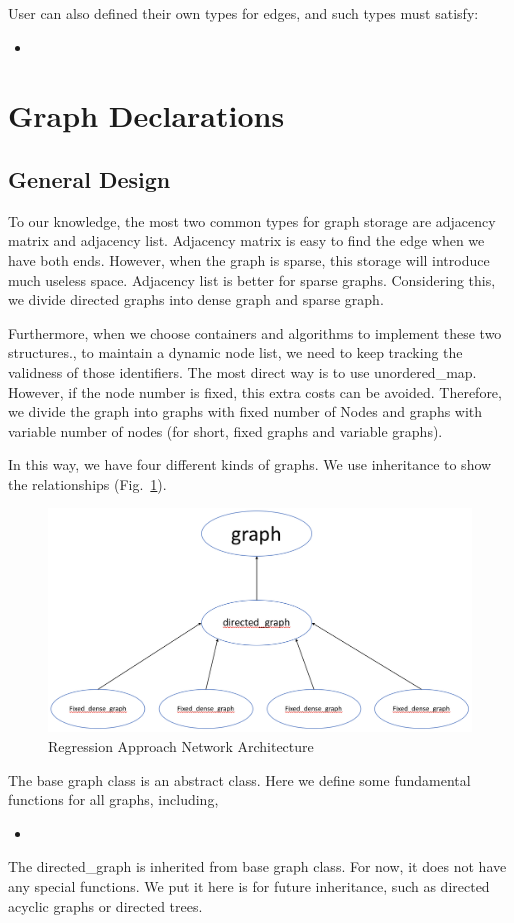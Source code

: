 \documentclass[]{article}
\begin{document}
User can also defined their own types for edges, and such types must satisfy:
\begin{itemize}
	\item 
\end{itemize}

\section{Graph Declarations}
\subsection{General Design}
To our knowledge, the most two common types for graph storage are adjacency matrix and adjacency list. Adjacency matrix is easy to find the edge when we have both ends. However, when the graph is sparse, this storage will introduce much useless space. Adjacency list is better for sparse graphs. Considering this, we divide directed graphs into dense graph and sparse graph.

Furthermore, when we choose containers and algorithms to implement these two structures., to maintain a dynamic node list, we need to keep tracking the validness of those identifiers. The most direct way is to use unordered\_map. However, if the node number is fixed, this extra costs can be avoided. Therefore, we divide the graph into graphs with fixed number of Nodes and graphs with variable number of nodes (for short, fixed graphs and variable graphs).

In this way, we have four different kinds of graphs. We use inheritance to show the relationships (Fig.~\ref{fig:graph}).
\begin{figure}
	\centering
	\includegraphics[scale=0.4]{graph.png}
	\caption{Regression Approach Network Architecture}
	
	\label{fig:graph}
\end{figure}
The base graph class is an abstract class. Here we define some fundamental functions for all graphs, including,
\begin{itemize}
	\item
\end{itemize}
The directed\_graph is inherited from base graph class. For now, it does not have any special functions. We put it here is for future inheritance, such as directed acyclic graphs or directed trees.
\end{document}
